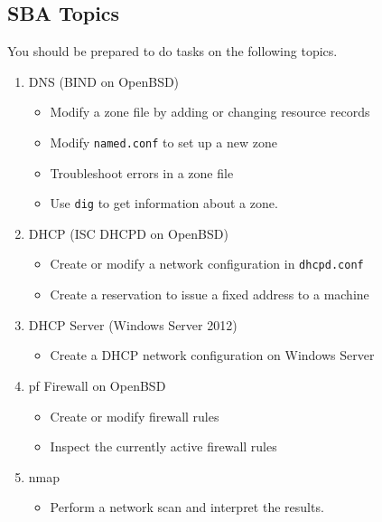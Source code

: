 \documentclass[10pt,a4paper]{article}
\begin{document}
\subsection*{SBA Topics}
You should be prepared to do tasks on the following topics.
\begin{enumerate}
\item DNS (BIND on OpenBSD)
  \begin{itemize}
    \item Modify a zone file by adding or changing resource records
    \item Modify \texttt{named.conf} to set up a new zone
    \item Troubleshoot errors in a zone file
    \item Use \texttt{dig} to get information about a zone.
   \end{itemize}
 \item DHCP (ISC DHCPD on OpenBSD)
   \begin{itemize}
     \item Create or modify a network configuration in \texttt{dhcpd.conf}
     \item Create a reservation to issue a fixed address to a machine
   \end{itemize}
 \item DHCP Server (Windows Server 2012)
   \begin{itemize}
     \item Create a DHCP network configuration on Windows Server
   \end{itemize}
 \item pf  Firewall on OpenBSD
   \begin{itemize}
     \item Create or modify firewall rules
     \item Inspect the currently active firewall rules
   \end{itemize}
 \item nmap
   \begin{itemize}
     \item Perform a network scan and interpret the results.
   \end{itemize}
\end{enumerate}
\end{document}
